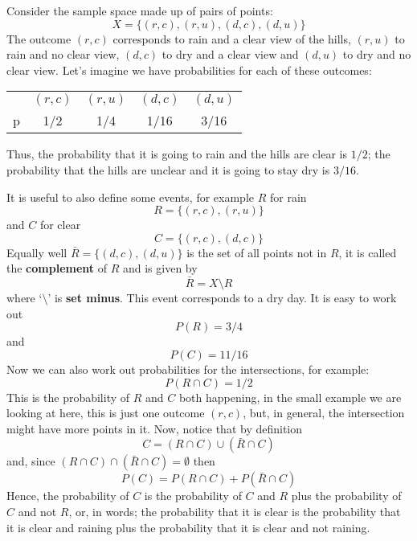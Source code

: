 \documentclass[11pt,a4paper]{scrartcl}
\begin{document}
Consider the sample space made up of pairs of points:
\begin{equation}
X=\{(r,c),(r,u),(d,c),(d,u)\}
\end{equation}
The outcome $(r,c)$ corresponds to rain and a clear view of the hills,
$(r,u)$ to rain and no clear view, $(d,c)$ to dry and a clear view and
$(d,u)$ to dry and no clear view. Let's imagine we have probabilities
for each of these outcomes:
\begin{center}
\begin{tabular}{c|cccc}
&$(r,c)$&$(r,u)$&$(d,c)$&$(d,u)$\\
p&1/2&1/4&1/16&3/16
\end{tabular}
\end{center}
Thus, the probability that it is going to rain and the hills are clear
is $1/2$; the probability that the hills are unclear and it is going
to stay dry is $3/16$. 

It is useful to also define some events, for example $R$ for rain
\begin{equation}
R=\{(r,c),(r,u)\}
\end{equation}
and $C$ for clear
\begin{equation}
C=\{(r,c),(d,c)\}
\end{equation}
Equally well $\bar{R}=\{(d,c),(d,u)\}$ is the set of all points not in $R$, it is called the \textbf{complement} of $R$ and is given by
\begin{equation}
\bar{R}=X\setminus R
\end{equation}
where \lq{}$\setminus$\rq{} is \textbf{set minus}. This event
corresponds to a dry day. It is easy to work out
\begin{equation}
P(R)=3/4
\end{equation}
and 
\begin{equation}
P(C)=11/16
\end{equation}
Now we can also work out probabilities for the intersections, for example:
\begin{equation}
P(R\cap C)=1/2
\end{equation}
This is the probability of $R$ and $C$ both happening, in the small
example we are looking at here, this is just one outcome $(r,c)$, but,
in general, the intersection might have more points in it. Now, notice
that by definition
\begin{equation}
C=(R\cap C)\cup (\bar{R}\cap C)
\end{equation}
and, since $(R\cap C)\cap (\bar{R}\cap C)=\emptyset$ then
\begin{equation}
P(C)=P(R\cap C)+P(\bar{R}\cap C)
\end{equation}
Hence, the probability of $C$ is the probability of $C$ and $R$ plus
the probability of $C$ and not $R$, or, in words; the probability that
it is clear is the probability that it is clear and raining plus the
probability that it is clear and not raining.
\end{document}
